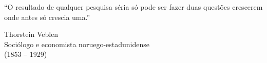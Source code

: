 
\epigraph{``O resultado de qualquer pesquisa séria só pode ser fazer
duas questões crescerem onde antes só crescia uma.''}{Thorstein
Veblen\\Sociólogo e economista noruego-estadunidense\\(1853 -- 1929)}
